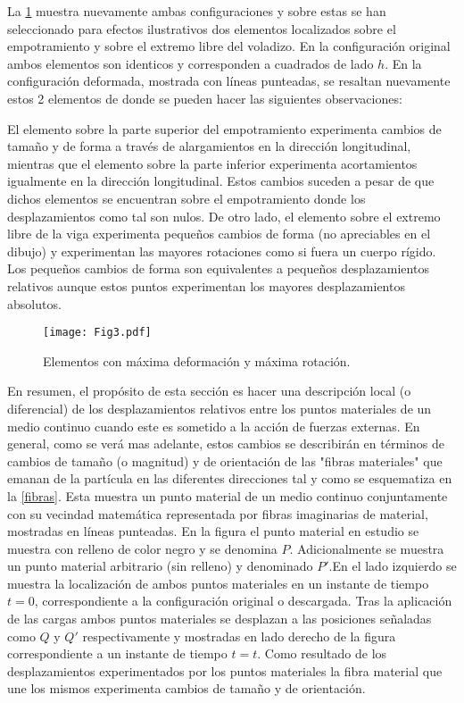 \documentclass[../notas medios.tex]{subfiles}
\begin{document}
La \cref{viga3} muestra nuevamente ambas configuraciones y sobre estas se han seleccionado para efectos ilustrativos dos elementos localizados sobre el empotramiento y sobre el extremo libre del voladizo. En la configuración original ambos elementos son identicos y corresponden a cuadrados de lado $h$. En la configuración deformada, mostrada con líneas punteadas, se resaltan nuevamente estos 2 elementos de donde se pueden hacer las siguientes observaciones:

El elemento sobre la parte superior del empotramiento experimenta cambios de tamaño y de forma a través de alargamientos en la dirección longitudinal, mientras que el elemento sobre la parte inferior experimenta acortamientos igualmente en la dirección longitudinal. Estos cambios suceden a pesar de que dichos elementos se encuentran sobre el empotramiento donde los desplazamientos como tal son nulos. De otro lado, el elemento sobre el extremo libre de la viga experimenta pequeños cambios de forma  (no apreciables en el dibujo) y experimentan las mayores rotaciones como si fuera un cuerpo rígido. Los pequeños cambios de forma son equivalentes a pequeños desplazamientos relativos aunque estos puntos experimentan los mayores desplazamientos absolutos.


\begin{figure}[H]
\centering
	\texttt{[image: Fig3.pdf]}
	\caption{Elementos con máxima deformación y máxima rotación.}
	\label{viga3}
\end{figure}

En resumen, el propósito de esta sección es hacer una descripción local (o diferencial) de los desplazamientos relativos entre los puntos materiales de un medio continuo cuando este es sometido a la acción de fuerzas externas. En general, como se verá mas adelante, estos cambios se describirán en términos de cambios de tamaño (o magnitud) y de orientación de las "fibras materiales" que emanan de la partícula en las diferentes direcciones tal y como se esquematiza en la \cref{fibras}. Esta muestra un punto material de un medio continuo conjuntamente con su vecindad matemática representada por fibras imaginarias de material, mostradas en líneas punteadas. En la figura el punto material en estudio se muestra con relleno de color negro y se denomina $P$. Adicionalmente se muestra un punto material arbitrario (sin relleno) y denominado $P'$.En el lado izquierdo se muestra la localización de ambos puntos materiales en un instante de tiempo $t=0$, correspondiente a la configuración original o descargada. Tras la aplicación de las cargas ambos puntos materiales se desplazan a las posiciones señaladas como $Q$ y $Q'$ respectivamente y mostradas en lado derecho de la figura correspondiente a un instante de tiempo $t=t$. Como resultado de los desplazamientos experimentados por los puntos materiales la fibra material que une los mismos experimenta cambios de tamaño y de orientación.
\end{document}
